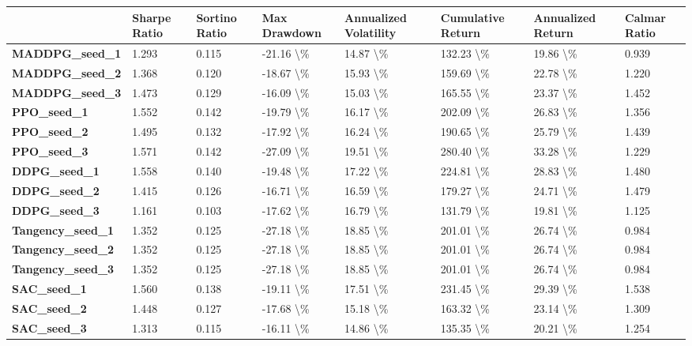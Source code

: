\begin{tabular}{llllllll}
\toprule
 & Sharpe Ratio & Sortino Ratio & Max Drawdown & Annualized Volatility & Cumulative Return & Annualized Return & Calmar Ratio \\
\midrule
\textbf{MADDPG\_seed\_1} & 1.293 & 0.115 & -21.16 \textbackslash \% & 14.87 \textbackslash \% & 132.23 \textbackslash \% & 19.86 \textbackslash \% & 0.939 \\
\textbf{MADDPG\_seed\_2} & 1.368 & 0.120 & -18.67 \textbackslash \% & 15.93 \textbackslash \% & 159.69 \textbackslash \% & 22.78 \textbackslash \% & 1.220 \\
\textbf{MADDPG\_seed\_3} & 1.473 & 0.129 & -16.09 \textbackslash \% & 15.03 \textbackslash \% & 165.55 \textbackslash \% & 23.37 \textbackslash \% & 1.452 \\
\textbf{PPO\_seed\_1} & 1.552 & 0.142 & -19.79 \textbackslash \% & 16.17 \textbackslash \% & 202.09 \textbackslash \% & 26.83 \textbackslash \% & 1.356 \\
\textbf{PPO\_seed\_2} & 1.495 & 0.132 & -17.92 \textbackslash \% & 16.24 \textbackslash \% & 190.65 \textbackslash \% & 25.79 \textbackslash \% & 1.439 \\
\textbf{PPO\_seed\_3} & 1.571 & 0.142 & -27.09 \textbackslash \% & 19.51 \textbackslash \% & 280.40 \textbackslash \% & 33.28 \textbackslash \% & 1.229 \\
\textbf{DDPG\_seed\_1} & 1.558 & 0.140 & -19.48 \textbackslash \% & 17.22 \textbackslash \% & 224.81 \textbackslash \% & 28.83 \textbackslash \% & 1.480 \\
\textbf{DDPG\_seed\_2} & 1.415 & 0.126 & -16.71 \textbackslash \% & 16.59 \textbackslash \% & 179.27 \textbackslash \% & 24.71 \textbackslash \% & 1.479 \\
\textbf{DDPG\_seed\_3} & 1.161 & 0.103 & -17.62 \textbackslash \% & 16.79 \textbackslash \% & 131.79 \textbackslash \% & 19.81 \textbackslash \% & 1.125 \\
\textbf{Tangency\_seed\_1} & 1.352 & 0.125 & -27.18 \textbackslash \% & 18.85 \textbackslash \% & 201.01 \textbackslash \% & 26.74 \textbackslash \% & 0.984 \\
\textbf{Tangency\_seed\_2} & 1.352 & 0.125 & -27.18 \textbackslash \% & 18.85 \textbackslash \% & 201.01 \textbackslash \% & 26.74 \textbackslash \% & 0.984 \\
\textbf{Tangency\_seed\_3} & 1.352 & 0.125 & -27.18 \textbackslash \% & 18.85 \textbackslash \% & 201.01 \textbackslash \% & 26.74 \textbackslash \% & 0.984 \\
\textbf{SAC\_seed\_1} & 1.560 & 0.138 & -19.11 \textbackslash \% & 17.51 \textbackslash \% & 231.45 \textbackslash \% & 29.39 \textbackslash \% & 1.538 \\
\textbf{SAC\_seed\_2} & 1.448 & 0.127 & -17.68 \textbackslash \% & 15.18 \textbackslash \% & 163.32 \textbackslash \% & 23.14 \textbackslash \% & 1.309 \\
\textbf{SAC\_seed\_3} & 1.313 & 0.115 & -16.11 \textbackslash \% & 14.86 \textbackslash \% & 135.35 \textbackslash \% & 20.21 \textbackslash \% & 1.254 \\
\bottomrule
\end{tabular}
